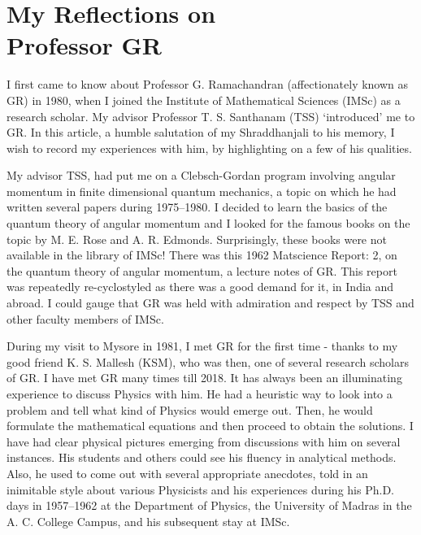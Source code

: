 \chapter[My Reflections on Professor GR]{My Reflections on\\ Professor GR}\label{chap12}



I first came to know about Professor G. Ramachandran (affectionately known as GR) in 1980, when I joined the Institute of Mathematical Sciences (IMSc) as a research scholar. My advisor Professor T. S. Santhanam (TSS) `introduced' me to GR. In this article, a humble salutation of my Shraddhanjali to his memory, I wish to record my experiences with him, by highlighting on a few of his qualities.

My advisor TSS, had put me on a Clebsch-Gordan program involving angular momentum in finite dimensional quantum mechanics, a topic on which he had written several papers during 1975--1980. I decided to learn the basics of the quantum theory of angular momentum and I looked for the famous books on the topic by M. E. Rose and A. R. Edmonds. Surprisingly, these books were not available in the library of IMSc! There was this 1962 Matscience Report: 2, on the quantum theory of angular momentum, a lecture notes of GR. This report was repeatedly re-cyclostyled as there was a good demand for it, in India and abroad. I could gauge that GR was held with admiration and respect by TSS and other faculty members of IMSc.

During my visit to Mysore in 1981, I met GR for the first time - thanks to my good friend K. S. Mallesh (KSM), who was then, one of several research scholars of GR. I have met GR many times till 2018. It has always been an illuminating experience to discuss Physics with him. He had a heuristic way to look into a problem and tell what kind of Physics would emerge out. Then, he would formulate the mathematical equations and then proceed to obtain the solutions. I have had clear physical pictures emerging from discussions with him on several instances. His students and others could see his fluency in analytical methods. Also, he used to come out with several appropriate anecdotes, told in an inimitable style about various Physicists and his experiences during his Ph.D. days in 1957--1962 at the Department of Physics, the University of Madras in the A. C. College Campus, and his subsequent stay at IMSc.

